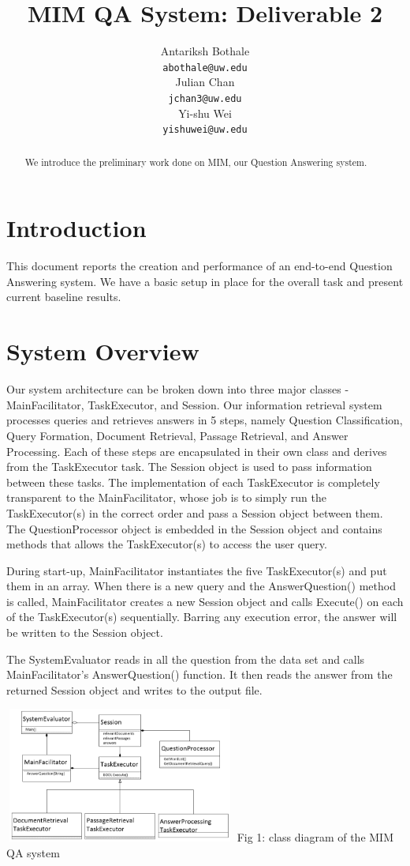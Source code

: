 \documentclass[11pt]{article}
\title{MIM QA System: Deliverable 2}
\author{Antariksh Bothale \\
  {\tt abothale@uw.edu} \\\And
  Julian Chan\\
  {\tt jchan3@uw.edu} \\\And
  Yi-shu Wei\\
  {\tt yishuwei@uw.edu}}
\date{}
\begin{document}
\maketitle
\begin{abstract}
We introduce the preliminary work done on MIM, our Question Answering system.
\end{abstract}

\section{Introduction}
This document reports the creation and performance of an end-to-end Question Answering system. We have a basic setup in place for the overall task and present current baseline results.  

\section{System Overview}

Our system architecture can be broken down into three major classes - MainFacilitator, TaskExecutor, and Session. Our information retrieval system processes queries and retrieves answers in 5 steps, namely Question Classification, Query Formation, Document Retrieval, Passage Retrieval, and Answer Processing. Each of these steps are encapsulated in their own class and derives from the TaskExecutor task.  The Session object is used to pass information between these tasks. The implementation of each TaskExecutor is completely transparent to the MainFacilitator, whose job is to simply run the TaskExecutor(s) in the correct order and pass a Session object between them. The QuestionProcessor object is embedded in the Session object and contains methods that allows the TaskExecutor(s) to access the user query.

During start-up, MainFacilitator instantiates the five TaskExecutor(s) and put them in an array. When there is a new query and the AnswerQuestion() method is called, MainFacilitator creates a new Session object and calls Execute() on each of the TaskExecutor(s) sequentially. Barring any execution error, the answer will be written to the Session object. 

The SystemEvaluator reads in all the question from the data set and calls MainFacilitator's AnswerQuestion() function. It then reads the answer from the returned Session object and 
writes to the output file.

\includegraphics[width=3in,height=1.75in]{MIM_class_diagram.png}
Fig 1: class diagram of the MIM QA system
\end{document}
